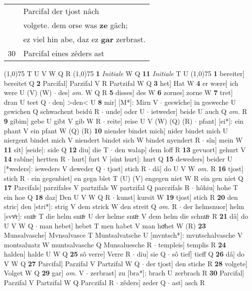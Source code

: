 \documentclass[8pt,a4paper,notitlepage]{article}
\begin{document}
\begin{table}[ht]
\begin{minipage}[t]{0.5\linewidth}
\begin{tabular}{rl}
 & Parcifal der tjost nâch\\ 
 & volgete. dem orse was \textbf{ze} gâch;\\ 
 & ez viel hin abe, daz ez \textbf{gar} zerbrast.\\ 
30 & Parcifal eines zêders ast\\ 
\end{tabular}
\scriptsize
\line(1,0){75} \newline
T U V W Q R \newline
\line(1,0){75} \newline
\textbf{1} \textit{Initiale} W Q  \textbf{11} \textit{Initiale} T U  \newline
\line(1,0){75} \newline
\textbf{1} bereiter] bereitet Q \textbf{2} Parcifal] Parzifal V R Partzifal W Q \textbf{3} het] Hat W \textbf{4} er wære] ich were U (V) (W)  $\cdot$ des] \textit{om.} W Q R \textbf{5} disses] des W \textbf{6} zornes] zorne W \textbf{7} tret] dran U teet Q  $\cdot$ den] >den< U \textbf{8} mir] [M*]: Mirn V  $\cdot$ geswîche] in gesweche U gewichen Q schwachent beidú R  $\cdot$ unde] oder U  $\cdot$ ietweder] beide U auch Q \textit{om.} R \textbf{9} gibim] gebe U gibt V gib W R  $\cdot$ reite] reise U V (W) (Q) (R)  $\cdot$ pfant] [ei*]: ein phant V ein pfant W (Q) (R) \textbf{10} niender bindet mich] nider bindet mich U niergent bindet mich V niendert bindet sich W bindet nyendert R  $\cdot$ sîn] mein W \textbf{11} sît] [seide]: side Q \textbf{12} diu] die T  $\cdot$ den walap] dem loff R \textbf{13} gevuort] gehurt V \textbf{14} rabîne] hertten R  $\cdot$ hurt] furt V [sint hurt]: hurt Q \textbf{15} deweders] beider U [*weders]: ieweders V deweder Q  $\cdot$ tjost] stich R  $\cdot$ dâ] do U V W \textit{om.} R \textbf{16} tjost] stich R  $\cdot$ ein gegenbiet] en gegn bîet T (U) (V) engegen niet W R ein gen niet Q \textbf{17} Parcifals] parzifales V partzifals W partzifal Q parczifals R  $\cdot$ hôhiu] hohe T ein hoe Q \textbf{18} daz] Den U V W Q R  $\cdot$ kunst] kursit W \textbf{19} tjost] stich R \textbf{20} den stric] den [stri*]: strig V dem strick W den streit Q \textit{om.} R  $\cdot$ der helmsnuor] helm [svvͦr]: snuͦr T die helm snuͦr U der helme snuͦr V dem helm die schnuͦr R \textbf{21} dâ] do U V W Q  $\cdot$ man hebet] hebet T men habet V man hoͤhet W (R) \textbf{23} Munsalvasche] Mvnsalvasce T Muntsalvatsche U [mvntsch*]: mvntschalvasche V montsaluatz W muntsalvasche Q Munsaluesche R  $\cdot$ templeis] templis R \textbf{24} halden] halde U W Q \textbf{25} sô verre] Verre R  $\cdot$ diu] sie Q  $\cdot$ sô tief] tieff Q \textbf{26} dâ] do V W Q \textbf{27} Parcifal] Parzifal V Partzifal W Q  $\cdot$ der tjost] den stiche R \textbf{28} volgete] Volget W Q \textbf{29} gar] \textit{om.} V  $\cdot$ zerbrast] zu [bra*]: brach U zerbrach R \textbf{30} Parcifal] Parzifal V Partzifal W Q Parczifal R  $\cdot$ zêders] zeder Q  $\cdot$ ast] asch R \newline
\end{minipage}
\end{table}
\end{document}

